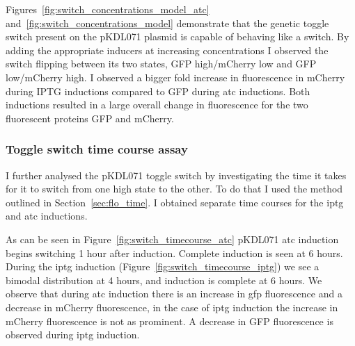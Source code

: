 Figures~\ref{fig:switch_concentrations_model_atc} and~\ref{fig:switch_concentrations_model} demonstrate that the genetic toggle switch present on the pKDL071 plasmid is capable of behaving like a switch. By adding the appropriate inducers at increasing concentrations I observed the switch flipping between its two states, GFP high/mCherry low and GFP low/mCherry high. I observed a bigger fold increase in fluorescence in mCherry during IPTG inductions compared to GFP during \acrshort{atc} inductions. Both inductions resulted in a large overall change in fluorescence for the two fluorescent proteins GFP and mCherry. 

\clearpage
\subsubsection{Toggle switch time course assay}
\label{sec:ts_time}
I further analysed the pKDL071 toggle switch by investigating the time it takes for it to switch from one high state to the other. To do that I used the method outlined in Section~\ref{sec:flo_time}. I obtained separate time courses for the \acrshort{iptg} and \acrshort{atc} inductions. 

As can be seen in Figure~\ref{fig:switch_timecourse_atc} pKDL071 \acrshort{atc}  induction begins switching 1 hour after induction. Complete induction is seen at 6 hours. During the \acrshort{iptg} induction (Figure~\ref{fig:switch_timecourse_iptg}) we see a bimodal distribution at 4 hours, and induction is complete at 6 hours. We observe that during \acrshort{atc} induction there is an increase in \acrshort{gfp} fluorescence and a decrease in mCherry fluorescence, in the case of \acrshort{iptg} induction the increase in mCherry fluorescence is not as prominent. A decrease in GFP fluorescence is observed during \acrshort{iptg} induction. 

